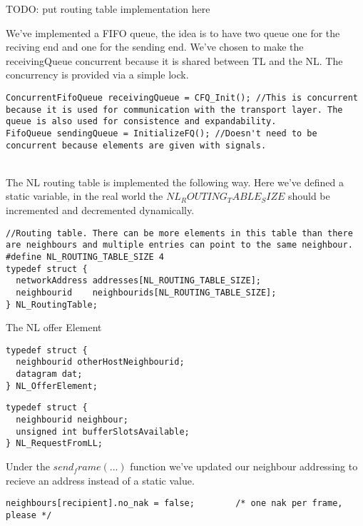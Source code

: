 TODO: put routing table implementation here

We've implemented a FIFO queue, the idea is to have two queue one for the reciving end and one for the sending end.
We've chosen to make the receivingQueue concurrent because it is shared between TL and the NL.
The concurrency is provided via a simple lock.

\begin{lstlisting}
ConcurrentFifoQueue receivingQueue = CFQ_Init(); //This is concurrent because it is used for communication with the transport layer. The queue is also used for consistence and expandability.
FifoQueue sendingQueue = InitializeFQ(); //Doesn't need to be concurrent because elements are given with signals.
\end{lstlisting}

\\




The NL routing table is implemented the following way.
Here we've defined a static variable, in the real world the $NL_ROUTING_TABLE_SIZE$ should be incremented and decremented dynamically.
\begin{lstlisting}
//Routing table. There can be more elements in this table than there are neighbours and multiple entries can point to the same neighbour.
#define NL_ROUTING_TABLE_SIZE 4
typedef struct {
  networkAddress addresses[NL_ROUTING_TABLE_SIZE];
  neighbourid    neighbourids[NL_ROUTING_TABLE_SIZE];
} NL_RoutingTable;
\end{lstlisting}

\break


The NL offer Element
\begin{lstlisting}
typedef struct {
  neighbourid otherHostNeighbourid;
  datagram dat;
} NL_OfferElement;
\end{lstlisting}

\break

\begin{lstlisting}
typedef struct {
  neighbourid neighbour;
  unsigned int bufferSlotsAvailable;
} NL_RequestFromLL;

\end{lstlisting}



Under the $send_frame(...)$ function we've updated our neighbour addressing to recieve an address instead of a static value.
\begin{lstlisting}
neighbours[recipient].no_nak = false;        /* one nak per frame, please */
\end{lstlisting}














